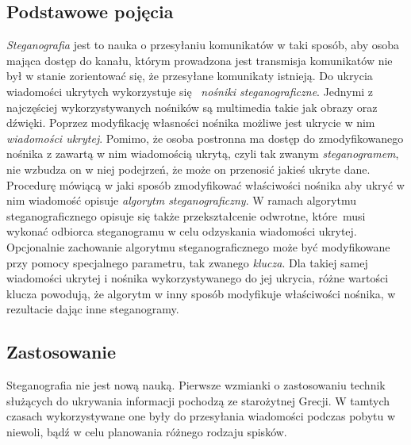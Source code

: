 \documentclass[a4paper, twoside]{report}
\begin{document}
        \subsection{Podstawowe pojęcia}
        \emph{Steganografia} jest to nauka o przesyłaniu komunikatów w taki sposób, aby
        osoba mająca dostęp do kanału, którym prowadzona jest transmisja komunikatów
        nie był w stanie zorientować się, że przesyłane komunikaty istnieją.
        Do ukrycia wiadomości ukrytych wykorzystuje się 
        \emph{nośniki steganograficzne}\cite{STEGANOGRAFIASIECIOWAART}.
        Jednymi z najczęściej wykorzystywanych nośników są multimedia takie jak
        obrazy oraz dźwięki. Poprzez modyfikację własności nośnika możliwe jest
        ukrycie w nim \emph{wiadomości ukrytej}. Pomimo, że osoba postronna ma
        dostęp do zmodyfikowanego nośnika z zawartą w nim wiadomością ukrytą,
        czyli tak zwanym \emph{steganogramem}, nie wzbudza on w niej podejrzeń,
        że może on przenosić jakieś ukryte dane. Procedurę mówiącą w jaki sposób
        zmodyfikować właściwości nośnika aby ukryć w nim wiadomość opisuje
        \emph{algorytm steganograficzny}. W ramach algorytmu steganograficznego
        opisuje się także przekształcenie odwrotne, które musi
        wykonać odbiorca steganogramu w celu odzyskania wiadomości ukrytej.
        Opcjonalnie zachowanie algorytmu steganograficznego może być modyfikowane przy pomocy specjalnego
        parametru, tak zwanego \emph{klucza}.  Dla takiej samej wiadomości ukrytej i nośnika
        wykorzystywanego do jej ukrycia, różne wartości klucza powodują, że algorytm
        w inny sposób modyfikuje właściwości nośnika, w rezultacie dając inne
        steganogramy.

        \subsection{Zastosowanie}
        Steganografia nie jest nową nauką. Pierwsze wzmianki o zastosowaniu technik
        służących do ukrywania informacji pochodzą ze starożytnej Grecji.\cite{STEGANOGRAPHYINTRO}
        W tamtych czasach wykorzystywane one były do przesyłania wiadomości
        podczas pobytu w niewoli, bądź w celu planowania różnego rodzaju spisków.
\end{document}

